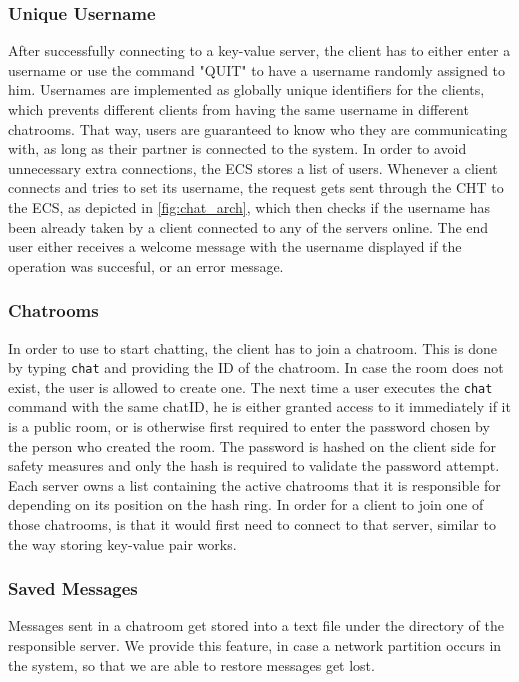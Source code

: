 \subsubsection{Unique Username}
\label{sec:groupchat_funtionalities_uniqueusername}
After successfully connecting to a key-value server, the client has to either enter a username or use the command "QUIT" to have a username randomly assigned to him. Usernames are implemented as globally unique identifiers for the clients, which prevents different clients from having the same username in different chatrooms. That way, users are guaranteed to know who they are communicating with, as long as their partner is connected to the system.
In order to avoid unnecessary extra connections, the ECS stores a list of users. Whenever a client connects and tries to set its username, the request gets sent through the CHT to the ECS, as depicted in \ref{fig:chat_arch}, which then checks if the username has been already taken by a client connected to any of the servers online. The end user either receives a welcome message with the username displayed if the operation was succesful, or an error message.
 
\subsubsection{Chatrooms}
\label{sec:groupchat_funtionalities_chatcommand}
In order to use to start chatting, the client has to join a chatroom. This is done by typing \texttt{chat} and providing the ID of the chatroom. In case the room does not exist, the user is allowed to create one. The next time a user executes the \texttt{chat} command with the same chatID, he is either granted access to it immediately if it is a public room, or is otherwise first required to enter the password chosen by the person who created the room. The password is hashed on the client side for safety measures and only the hash is required to validate the password attempt.
Each server owns a list containing the active chatrooms that it is responsible for depending on its position on the hash ring. In order for a client to join one of those chatrooms, is that it would first need to connect to that server, similar to the way storing key-value pair works.

\subsubsection{Saved Messages}
\label{sec:groupchat_funtionalities_savedmessages}
Messages sent in a chatroom get stored into a text file under the directory of the responsible server. We provide this feature, in case a network partition occurs in the system, so that we are able to restore messages get lost.

